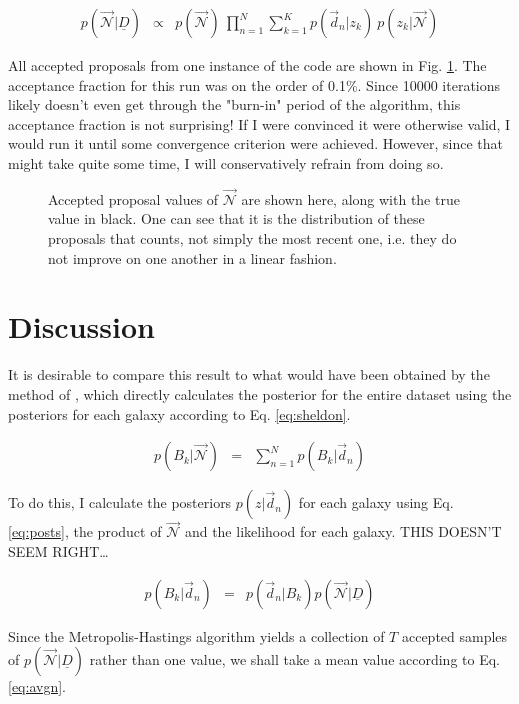 \documentclass[12pt, onecolumn]{emulateapj}
\newcommand{\textul}{\underline}
\begin{document}
\begin{eqnarray}
\label{eq:disc-post}
p(\vec{\mathcal{N}}|\textul{D}) &\propto& p(\vec{\mathcal{N}})\  \prod_{n=1}^{N}\sum_{k=1}^{K}p(\vec{d}_{n}|z_{k})\ p(z_{k}|\vec{\mathcal{N}})
\end{eqnarray}

All accepted proposals from one instance of the code are shown in Fig. \ref{fig:results}.  The acceptance fraction for this run was on the order of 0.1\%.  Since 10000 iterations likely doesn't even get through the "burn-in" period of the algorithm, this acceptance fraction is not surprising!  If I were convinced it were otherwise valid, I would run it until some convergence criterion were achieved.  However, since that might take quite some time, I will conservatively refrain from doing so.

\begin{figure}
\label{fig:results}
\caption{Accepted proposal values of $\vec{\mathcal{N}}$ are shown here, along with the true value in black.  One can see that it is the distribution of these proposals that counts, not simply the most recent one, i.e. they do not improve on one another in a linear fashion.}
\end{figure}

\section{Discussion}

It is desirable to compare this result to what would have been obtained by the method of \citet{she11}, which directly calculates the posterior for the entire dataset using the posteriors for each galaxy according to Eq. \ref{eq:sheldon}.

\begin{eqnarray}
\label{eq:sheldon}
p(B_{k}|\vec{\mathcal{N}}) &=& \sum_{n=1}^{N}p(B_{k}|\vec{d}_{n})
\end{eqnarray}

To do this, I calculate the posteriors $p(z|\vec{d}_{n})$ for each galaxy using Eq. \ref{eq:posts}, the product of $\vec{\mathcal{N}}$ and the likelihood for each galaxy.  THIS DOESN'T SEEM RIGHT\dots

\begin{eqnarray}
\label{eq:posts}
p(B_{k}|\vec{d}_{n}) &=& p(\vec{d}_{n}|B_{k})p(\vec{\mathcal{N}}|\textul{D})
\end{eqnarray}

Since the Metropolis-Hastings algorithm yields a collection of $T$ accepted samples of $p(\vec{\mathcal{N}}|\textul{D})$ rather than one value, we shall take a mean value according to Eq. \ref{eq:avgn}.
\end{document}
